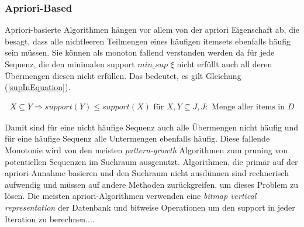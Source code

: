 \subsubsection{Apriori-Based}

Apriori-basierte Algorithmen hängen vor allem von der apriori Eigenschaft ab, die besagt, dass alle nichtleeren Teilmengen eines häufigen itemsets ebenfalls häufig sein müssen. Sie können als monoton fallend verstanden werden da für jede Sequenz, die den minimalen support $min\_sup$ $\xi$ nicht erfüllt auch all deren Übermengen diesen nicht erfüllen. Das bedeutet, es gilt Gleichung (\ref{supInEquation}).

\begin{align}
	X \subseteq Y \Rightarrow support(Y) \leq support(X) \text{  für  } X,Y \subseteq J, J: \text{  Menge aller items in  } D \label{supInEquation}
\end{align}

Damit sind für eine nicht häufige Sequenz auch alle Übermengen nicht häufig und für eine häufige Sequenz alle Untermengen ebenfalls häufig. Diese fallende Monotonie wird von den meisten \textit{pattern-growth} Algorithmen zum pruning von potentiellen Sequenzen im Suchraum ausgenutzt. Algorithmen, die primär auf der apriori-Annahme basieren und den Suchraum nicht ausdünnen sind rechnerisch aufwendig und müssen auf andere Methoden zurückgreifen, um dieses Problem zu lösen. Die meisten apriori-Algorithmen verwenden eine \textit{bitmap vertical representation} der Datenbank und bitweise Operationen um den support in jeder Iteration zu berechnen....
